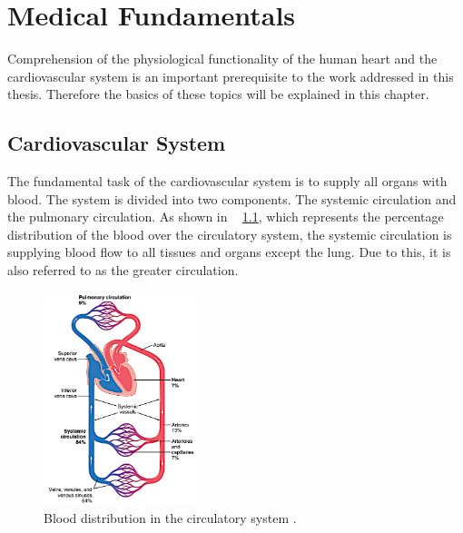 \chapter{Medical Fundamentals}
Comprehension of the physiological functionality of the human heart and the cardiovascular system is an important prerequisite to the work addressed in this thesis. Therefore the basics of these topics will be explained in this chapter.

\section{Cardiovascular System}
The fundamental task of the cardiovascular system is to supply all organs with blood. The system is divided into two components. The systemic circulation and the pulmonary circulation. As shown in \figurename~ \ref{fig:circulation}, which represents the percentage distribution of the blood over the circulatory system, the systemic circulation is supplying blood flow to all tissues and organs except the lung. Due to this, it is also referred to as the greater circulation. \cite{GH20}
\begin{figure}[h]
  \centering
  \includegraphics[width=0.4\textwidth, height=0.6\textwidth]{images/circulation.jpg}
  \caption{Blood distribution in the circulatory system \cite{GH20}.}
  \label{fig:circulation}
\end{figure}
